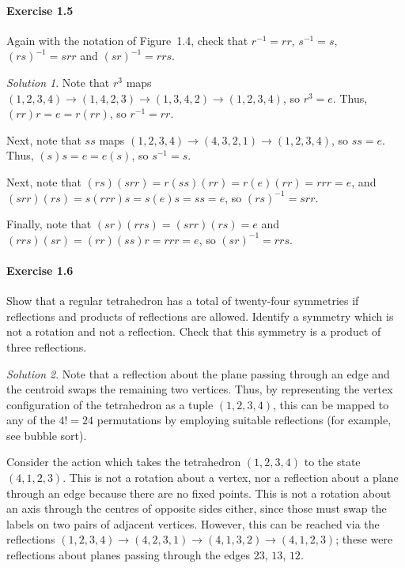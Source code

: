 \documentclass[11pt]{report}
\theoremstyle{remark}
\newtheorem*{solution}{Solution}
\begin{document}
    \paragraph{Exercise 1.5} Again with the notation of Figure~1.4, check that
    $r^{-1} = rr$, $s^{-1} = s$, $(rs)^{-1} = srr$ and $(sr)^{-1} = rrs$.
    \begin{solution}
        Note that $r^3$ maps $(1, 2, 3, 4) \to (1, 4, 2, 3) \to (1, 3, 4, 2) \to (1,
        2, 3, 4)$, so $r^3 = e$. Thus, $(rr)r = e = r(rr)$, so $r^{-1} = rr$.

        Next, note that $ss$ maps $(1, 2, 3, 4) \to (4, 3, 2, 1) \to (1, 2, 3, 4)$,
        so $ss = e$. Thus, $(s)s = e = e(s)$, so $s^{-1} = s$.

        Next, note that $(rs)(srr) = r(ss)(rr) = r(e)(rr) = rrr = e$, and $(srr)(rs)
        = s(rrr)s = s(e)s = ss = e$, so $(rs)^{-1} = srr$.

        Finally, note that $(sr)(rrs) = (srr)(rs) = e$ and $(rrs)(sr) = (rr)(ss)r =
        rrr = e$, so $(sr)^{-1} = rrs$.
    \end{solution}

    \paragraph{Exercise 1.6} Show that a regular tetrahedron has a total of
    twenty-four symmetries if reflections and products of reflections are allowed.
    Identify a symmetry which is not a rotation and not a reflection. Check that
    this symmetry is a product of three reflections.
    \begin{solution}
        Note that a reflection about the plane passing through an edge and the
        centroid swaps the remaining two vertices. Thus, by representing the vertex
        configuration of the tetrahedron as a tuple $(1, 2, 3, 4)$, this can be
        mapped to any of the $4! = 24$ permutations by employing suitable
        reflections (for example, see bubble sort).

        Consider the action which takes the tetrahedron $(1, 2, 3, 4)$ to the state
        $(4, 1, 2, 3)$.  This is not a rotation about a vertex, nor a reflection
        about a plane through an edge because there are no fixed points.
        This is not a rotation about an axis through the centres of opposite sides
        either, since those must swap the labels on two pairs of adjacent vertices.
        However, this can be reached via the reflections $(1, 2, 3, 4) \to (4, 2, 3,
        1) \to (4, 1, 3, 2) \to (4, 1, 2, 3)$; these were reflections about planes
        passing through the edges $23$, $13$, $12$.
    \end{solution}
\end{document}
